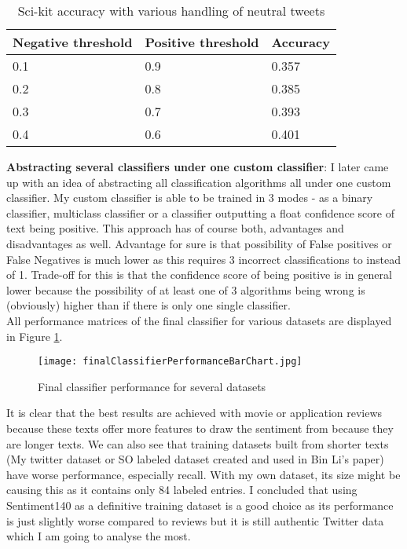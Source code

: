\begin{table} [H]%
\centering
\begin{tabular}{|p{4cm}|p{4cm}|p{3cm}|}
 \hline
\textbf{ Negative threshold }& \textbf{Positive threshold} & \textbf{Accuracy}\\
 \hline
 0.1 & 0.9 & 0.357\\ \hline
 0.2 & 0.8 & 0.385\\ \hline
 0.3 & 0.7 & 0.393\\ \hline 
 0.4 & 0.6 & 0.401\\ \hline 
\end{tabular}
\caption{Sci-kit accuracy with various handling of neutral tweets}
\label{table:negativeAccuracy}
\end{table}

\textbf{Abstracting several classifiers under one custom classifier}:
I later came up with an idea of abstracting all classification algorithms all under one custom classifier. My custom classifier is able to be trained in 3 modes - as a binary classifier, multiclass classifier or a classifier outputting a float confidence score of text being positive.
This approach has of course both, advantages and disadvantages as well. Advantage for sure is that possibility of False positives or False Negatives is much lower as this requires 3 incorrect classifications to instead of 1. Trade-off for this is that the confidence score of being positive is in general lower because the possibility of at least one of 3 algorithms being wrong is (obviously) higher than if there is only one single classifier.\\

All performance matrices of the final classifier for various datasets are displayed in Figure \ref{fig:finalClassifierPerformanceBarChart}.
\\

\begin{figure}[H]%
    \centering
	\texttt{[image: finalClassifierPerformanceBarChart.jpg]}
    \caption{Final classifier performance for several datasets}%
    \label{fig:finalClassifierPerformanceBarChart}%
\end{figure}

It is clear that the best results are achieved with movie or application reviews because these texts offer more features to draw the sentiment from because they are longer texts. We can also see that training datasets built from shorter texts (My twitter dataset or SO labeled dataset created and used in Bin Li's paper) have worse performance, especially recall. With my own dataset, its size might be causing this as it contains only 84 labeled entries. I concluded that using Sentiment140 as a definitive training dataset is a good choice as its performance is just slightly worse compared to reviews but it is still authentic Twitter data which I am going to analyse the most.